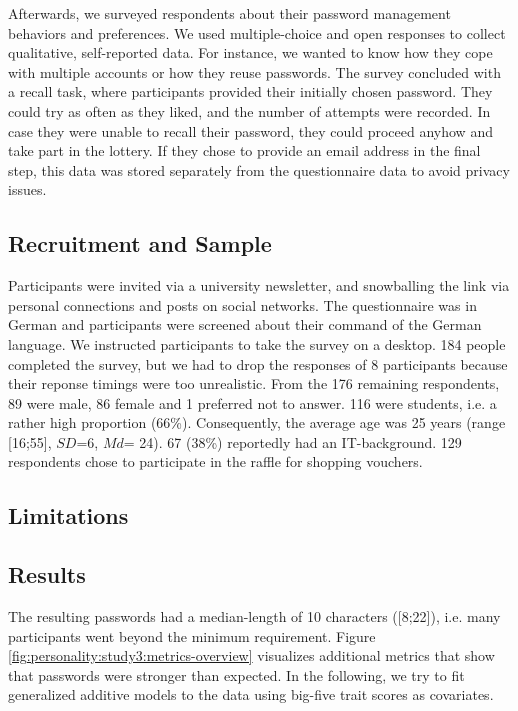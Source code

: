 Afterwards, we surveyed respondents about their password management behaviors and preferences. We used multiple-choice and open responses to collect qualitative, self-reported data. For instance, we wanted to know how they cope with multiple accounts or how they reuse passwords. The survey concluded with a recall task, where participants provided their initially chosen password. They could try as often as they liked, and the number of attempts were recorded. In case they were unable to recall their password, they could proceed anyhow and take part in the lottery. If they chose to provide an email address in the final step, this data was stored separately from the questionnaire data to avoid privacy issues. 

\subsection{Recruitment and Sample}
Participants were invited via a university newsletter, and snowballing the link via personal connections and posts on social networks. The questionnaire was in German and participants were screened about their command of the German language. We instructed participants to take the survey on a desktop. 
184 people completed the survey, but we had to drop the responses of 8 participants because their reponse timings were too unrealistic. From the 176 remaining respondents, 89 were male, 86 female and 1 preferred not to answer. 116 were students, i.e. a rather high proportion (66\%). Consequently, the average age was 25 years (range [16;55], $SD$=6, $Md$= 24). 67 (38\%) reportedly had an IT-background. 129 respondents chose to participate in the raffle for shopping vouchers. 

\subsection{Limitations}

\subsection{Results}
The resulting passwords had a median-length of 10 characters ([8;22]), i.e. many participants went beyond the minimum requirement. Figure \ref{fig:personality:study3:metrics-overview} visualizes additional metrics that show that passwords were stronger than expected. In the following, we try to fit generalized additive models to the data using big-five trait scores as covariates. 

